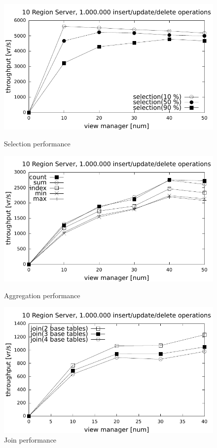 \begin{figure}
  \includegraphics[width=\linewidth]{figures/selection}
      \vspace{-5mm}
  \caption{Selection performance}\label{fig:selection}
        \vspace{-5mm}
\endminipage\hfill
{}
  \includegraphics[width=\linewidth]{figures/aggregations}
      \vspace{-5mm}
  \caption{Aggregation performance}\label{fig:viewtypes}
        \vspace{-5mm}
\endminipage\hfill
{}%
  \includegraphics[width=\linewidth]{figures/join}
      \vspace{-5mm}
  \caption{Join performance}\label{fig:join}
        \vspace{-5mm}
\endminipage
\end{figure}

